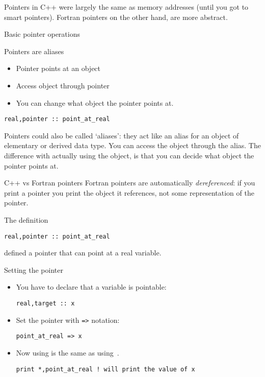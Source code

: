 
Pointers in C++ were largely the same as memory addresses (until you
got to smart pointers). Fortran pointers on the other hand, are more
abstract.

 {Basic pointer operations}

\begin{block}{Pointers are aliases}
  \label{sl:fpoint}
  \begin{itemize}
  \item Pointer points at an object
  \item Access object through pointer
  \item You can change what object the pointer points at.
  \end{itemize}
\begin{verbatim}
real,pointer :: point_at_real
\end{verbatim}
\end{block}

Pointers could also be called `aliases': they act like an alias for an
object of elementary or derived data type. You can access the object
through the alias. The difference with actually using the object, is
that you can decide what object the pointer points at.

\begin{block}{C++ vs Fortran pointers}
  \label{sl:cpoint-vs-fpoint}
  Fortran pointers are automatically
  \emph{dereferenced}: if you print a
  pointer you print the object it references, not some representation
  of the pointer.
\end{block}

The  definition
\begin{verbatim}
real,pointer :: point_at_real
\end{verbatim}
defined a pointer that can point at a real variable.

\begin{block}{Setting the pointer}
  \label{sl:fpoint-set}
  \begin{itemize}
  \item You have to declare that a variable is pointable:
\begin{verbatim}
real,target :: x
\end{verbatim}
\item Set the pointer with \verb+=>+ notation:
\begin{verbatim}
point_at_real => x
\end{verbatim}
\item Now using  is the same as using~.
\begin{verbatim}
print *,point_at_real ! will print the value of x
\end{verbatim}
  \end{itemize}
\end{block}

